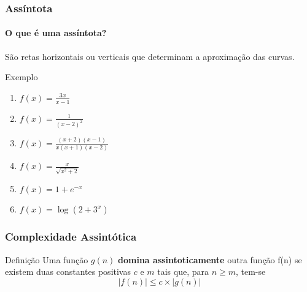 \documentclass[10pt]{beamer}
\begin{document}
\begin{frame}[t]
    \frametitle{Assíntota}
    \framesubtitle{O que é uma assíntota?}
    São retas horizontais ou verticais que determinam a aproximação das curvas.
    \begin{beamerboxesrounded}{Exemplo}
        \begin{enumerate}[label=\alph*)]
            \setlength\itemsep{1em}
            \item $f(x) = \frac{3x}{x-1}$
            \item $f(x) = \frac{1}{(x-2)^2}$
            \item $f(x) = \frac{(x+2)(x-1)}{x(x+1)(x-2)}$
            \item $f(x) = \frac{x}{\sqrt{x^2+2}}$
            \item $f(x) = 1+e^{-x}$
            \item $f(x) = \log\left(2+3^x\right)$
        \end{enumerate}
    \end{beamerboxesrounded}

\end{frame}

\begin{frame}[t]
    \frametitle{Complexidade Assintótica}
    \begin{beamerboxesrounded}{Definição}
        Uma função $g(n)$ \textbf{domina assintoticamente} outra função f(n) se existem duas constantes positivas $c$ e $m$ tais que, para $n\geq m$, tem-se $$\left|f(n)\right| \leq c\times \left|g(n)\right|$$
    \end{beamerboxesrounded}

    \pause\begin{center}
    \end{center}
\end{frame}
\end{document}
